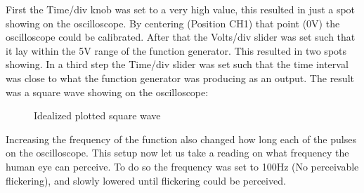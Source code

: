 \documentclass[fleqn,11pt]{article}
\begin{document}
First the Time/div knob was set to a very high value, this resulted in just a spot showing on the
oscilloscope. By centering (Position CH1) that point (0V) the oscilloscope could be calibrated. After that the
Volts/div slider was set such that it lay within the 5V range of the function generator. This resulted
in two spots showing. In a third step the Time/div slider was set such that the time interval was close
to what the function generator was producing as an output. The result was a square wave showing on the
oscilloscope:

\begin{figure}[H]
  \centering
  \caption{Idealized plotted square wave}
  \label{fig:figure2}
\end{figure}

Increasing the frequency of the function also changed how long each of the pulses on the oscilloscope.
This setup now let us take a reading on what frequency the human eye can perceive. To do so the
frequency was set to 100Hz (No perceivable flickering), and slowly lowered until flickering could be perceived.
\end{document}
